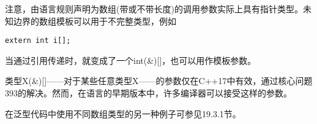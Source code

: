 注意，由语言规则声明为数组(带或不带长度)的调用参数实际上具有指针类型。未知边界的数组模板可以用于不完整类型，例如

\begin{lstlisting}[style=styleCXX]
extern int i[];
\end{lstlisting}

当通过引用传递时，就变成了一个int(\&)[]，也可以用作模板参数。

\begin{tcolorbox}[colback=webgreen!5!white,colframe=webgreen!75!black]
\hspace*{0.75cm}类型X(\&)[]——对于某些任意类型X——的参数仅在C++17中有效，通过核心问题393的解决。然而，在语言的早期版本中，许多编译器可以接受这样的参数。
\end{tcolorbox}

在泛型代码中使用不同数组类型的另一种例子可参见19.3.1节。

















